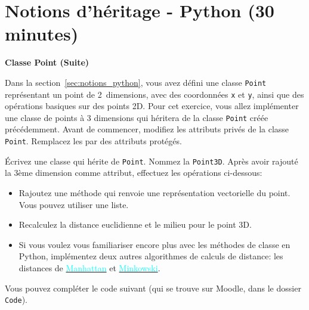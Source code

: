 \section{Notions d'héritage - Python (30 minutes)}
\begin{Exercice}[15 minutes]\textbf{Classe Point (Suite)}

    Dans la section~\ref{sec:notions_python}, vous avez défini une classe \lstinline{Point} représentant un point de 2~dimensions, avec des coordonnées \lstinline{x} et \lstinline{y}, ainsi que des opérations basiques sur des points 2D. Pour cet exercice, vous allez implémenter une classe de points à 3 dimensions qui héritera de la classe \lstinline{Point} créée précédemment.
    Avant de commencer, modifiez les attributs privés de la classe \lstinline{Point}. Remplacez les par des attributs protégés.
    

    
    Écrivez une classe qui hérite de \lstinline{Point}. Nommez la \lstinline{Point3D}. Après avoir rajouté la 3ème dimension comme attribut, effectuez les opérations ci-dessous:
    
    \begin{itemize}
        \item Rajoutez une méthode qui renvoie une représentation vectorielle du point. Vous pouvez utiliser une liste.
        \item Recalculez la distance euclidienne et le milieu pour le point 3D.
        \item \advanced Si vous voulez vous familiariser encore plus avec les méthodes de classe en Python, implémentez deux autres algorithmes de calculs de distance: les distances de \href{https://fr.wikipedia.org/wiki/Distance_de_Manhattan}{\textcolor{cyan}{Manhattan}} et \href{https://en.wikipedia.org/wiki/Minkowski_distance}{\textcolor{cyan}{Minkowski}}.
    \end{itemize}

    Vous pouvez compléter le code suivant (qui se trouve sur Moodle, dans le dossier \lstinline{Code}).
     
    

\end{Exercice}
